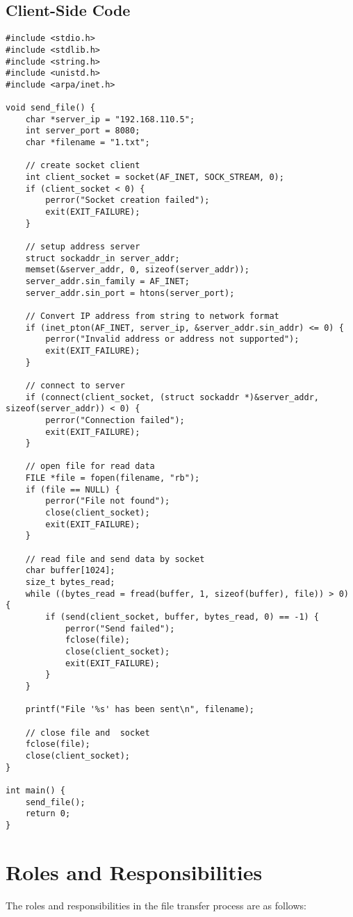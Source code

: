 \documentclass{article}
\begin{document}
\subsection{Client-Side Code}
\begin{verbatim}
#include <stdio.h>
#include <stdlib.h>
#include <string.h>
#include <unistd.h>
#include <arpa/inet.h>

void send_file() {
    char *server_ip = "192.168.110.5";
    int server_port = 8080;
    char *filename = "1.txt";

    // create socket client
    int client_socket = socket(AF_INET, SOCK_STREAM, 0);
    if (client_socket < 0) {
        perror("Socket creation failed");
        exit(EXIT_FAILURE);
    }

    // setup address server
    struct sockaddr_in server_addr;
    memset(&server_addr, 0, sizeof(server_addr));
    server_addr.sin_family = AF_INET;
    server_addr.sin_port = htons(server_port);

    // Convert IP address from string to network format
    if (inet_pton(AF_INET, server_ip, &server_addr.sin_addr) <= 0) {
        perror("Invalid address or address not supported");
        exit(EXIT_FAILURE);
    }

    // connect to server
    if (connect(client_socket, (struct sockaddr *)&server_addr, sizeof(server_addr)) < 0) {
        perror("Connection failed");
        exit(EXIT_FAILURE);
    }

    // open file for read data
    FILE *file = fopen(filename, "rb");
    if (file == NULL) {
        perror("File not found");
        close(client_socket);
        exit(EXIT_FAILURE);
    }

    // read file and send data by socket
    char buffer[1024];
    size_t bytes_read;
    while ((bytes_read = fread(buffer, 1, sizeof(buffer), file)) > 0) {
        if (send(client_socket, buffer, bytes_read, 0) == -1) {
            perror("Send failed");
            fclose(file);
            close(client_socket);
            exit(EXIT_FAILURE);
        }
    }

    printf("File '%s' has been sent\n", filename);

    // close file and  socket
    fclose(file);
    close(client_socket);
}

int main() {
    send_file();
    return 0;
}

\end{verbatim}

\section{Roles and Responsibilities}
The roles and responsibilities in the file transfer process are as follows:
\end{document}
